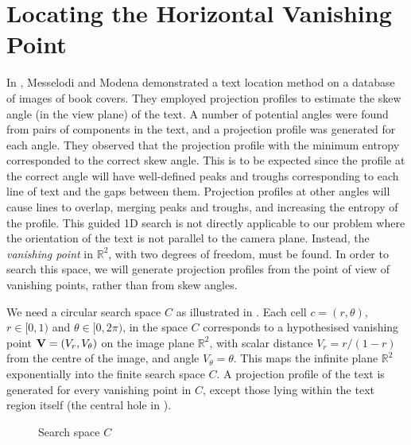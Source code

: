 \section{Locating the Horizontal Vanishing Point}  \label{locatehvpsect}

In \cite{messelod1}, Messelodi and Modena demonstrated a text location method on
a database of images of book covers.  They employed projection profiles to
estimate the skew angle (in the view plane) of the text.  A number of potential
angles were found from pairs of components in the text, and a projection profile
was generated for each angle.  They observed that the projection profile with
the minimum entropy corresponded to the correct skew angle.  This is to be
expected since the profile at the correct angle will have well-defined peaks and
troughs corresponding to each line of text and the gaps between them.
Projection profiles at other angles will cause lines to overlap, merging peaks
and troughs, and increasing the entropy of the profile.  This guided 1D search
is not directly applicable to our problem where the orientation of the text is
not parallel to the camera plane. Instead, the {\em vanishing point} in
$\mathbb{R}^2$, with two degrees of freedom, must be found. In order to search
this space, we will generate projection profiles from the point of view of
vanishing points, rather than from skew angles.



We need a circular search space $C$ as illustrated in .
Each cell $c=(r,\theta)$, $r\in[0,1)$ and $\theta\in[0,2\pi)$, in the space $C$
corresponds to a hypothesised vanishing point ${ \bf V } = (V_r,V_{\theta})$ on
the image plane $\mathbb{R}^2$, with scalar distance $V_{r}=r/{(1-r)}$ from the
centre of the image, and angle $V_{\theta}=\theta$.  This maps the infinite
plane $\mathbb{R}^2$ exponentially into the finite search space $C$.
A projection profile of the text is generated for
every vanishing point in $C$, except those lying within
the text region itself (the central hole in ).


\begin{figure}[ht!]
\centering
\begin{center}
	\hspace{5mm}
\end{center}
\vspace*{0mm}
\caption{Search space $C$}
\label{searchspace}
\end{figure}

